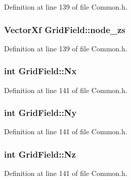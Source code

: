 Definition at line 139 of file Common.\+h.

\subsubsection[{\texorpdfstring{node\+\_\+zs}{node_zs}}]{\setlength{\rightskip}{0pt plus 5cm}Vector\+Xf Grid\+Field\+::node\+\_\+zs}\hypertarget{struct_grid_field_ab97e893cedd450d502165bcb7e3ed7ca}{}\label{struct_grid_field_ab97e893cedd450d502165bcb7e3ed7ca}


Definition at line 139 of file Common.\+h.

\subsubsection[{\texorpdfstring{Nx}{Nx}}]{\setlength{\rightskip}{0pt plus 5cm}int Grid\+Field\+::\+Nx}\hypertarget{struct_grid_field_a7777c8b5bf6db312fcceecdfd012c9ca}{}\label{struct_grid_field_a7777c8b5bf6db312fcceecdfd012c9ca}


Definition at line 141 of file Common.\+h.

\subsubsection[{\texorpdfstring{Ny}{Ny}}]{\setlength{\rightskip}{0pt plus 5cm}int Grid\+Field\+::\+Ny}\hypertarget{struct_grid_field_a4cc2cac3066c31f0e6af9745cf994674}{}\label{struct_grid_field_a4cc2cac3066c31f0e6af9745cf994674}


Definition at line 141 of file Common.\+h.

\subsubsection[{\texorpdfstring{Nz}{Nz}}]{\setlength{\rightskip}{0pt plus 5cm}int Grid\+Field\+::\+Nz}\hypertarget{struct_grid_field_ae624c780496411e632ca5581b84a6177}{}\label{struct_grid_field_ae624c780496411e632ca5581b84a6177}


Definition at line 141 of file Common.\+h.

